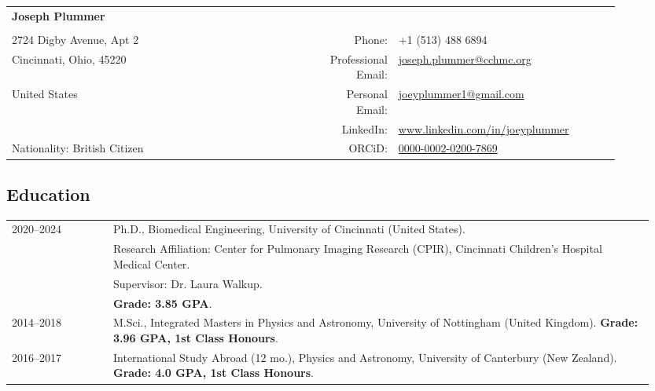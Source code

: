 \documentclass[12pt,]{scrartcl}
\date{}
\begin{document}
\begin{table}[h]
{\def\arraystretch{1.2}\tabcolsep=0pt
\begin{tabular}{p{0.50\linewidth}p{0.05\linewidth}p{0.35\linewidth}}

  \multirow{1}{*}{\LARGE \textbf{Joseph Plummer}} &  &  \\
  
  & & \\
  
  2724 Digby Avenue, Apt 2 & \multicolumn{1}{r}{Phone:\;\;} & \multicolumn{1}{l}{$+$1 (513) 488 6894} \\
  
  Cincinnati, Ohio, 45220 & \multicolumn{1}{r}{Professional Email:\;\;} &\multicolumn{1}{l}{\href{joseph.plummer@cchmc.org}{joseph.plummer@cchmc.org}} \\
  
  United States & \multicolumn{1}{r}{Personal Email:\;\;} &\multicolumn{1}{l}{\href{joeyplummer1@gmail.com}{joeyplummer1@gmail.com}} \\
  
   & \multicolumn{1}{r}{LinkedIn:\;\;} & \multicolumn{1}{l}{\url{www.linkedin.com/in/joeyplummer}} \\
  
  Nationality: British Citizen%
  & \multicolumn{1}{r}{ORCiD:\;\;} & \multicolumn{1}{l}{\href{https://orcid.org/0000-0002-0200-7869}{0000-0002-0200-7869}} 

\end{tabular}%
}
\end{table}
\subsection{Education}\label{education}


\begin{table}[h]
{\def\arraystretch{1.5}\tabcolsep=0pt
\begin{tabular}{p{0.15\linewidth}p{0.8\linewidth}}

  \multirow{2}{*}[0.85em]{2020--2024} & Ph.D., Biomedical Engineering, University of Cincinnati (United States). \\
  
  & Research Affiliation: Center for Pulmonary Imaging Research (CPIR), Cincinnati Children's Hospital Medical Center. \\
  & Supervisor: Dr. Laura Walkup. \\ & \textbf{Grade: 3.85 GPA}.\\
  
  2014--2018 & M.Sci., Integrated Masters in Physics and Astronomy, University of Nottingham (United Kingdom). \textbf{Grade: 3.96 GPA, 1st Class Honours}. \\

  2016--2017 & International Study Abroad (12 mo.), Physics and Astronomy, University of Canterbury (New Zealand). \textbf{Grade: 4.0 GPA, 1st Class Honours}. 
\end{tabular}%
}
\end{table}
\end{document}

